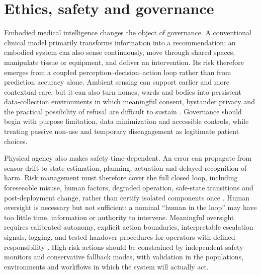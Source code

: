 \section{Ethics, safety and governance}

Embodied medical intelligence changes the object of governance. A conventional clinical model primarily transforms information into a recommendation; an embodied system can also sense continuously, move through shared spaces, manipulate tissue or equipment, and deliver an intervention. Its risk therefore emerges from a coupled perception--decision--action loop rather than from prediction accuracy alone. Ambient sensing can support earlier and more contextual care, but it can also turn homes, wards and bodies into persistent data-collection environments in which meaningful consent, bystander privacy and the practical possibility of refusal are difficult to sustain \cite{MartinezMartin2021AmbientIntelligence,Cohen2020RemoteMonitoringDevices,WHO2021AIEthics}. Governance should begin with purpose limitation, data minimization and accessible controls, while treating passive non-use and temporary disengagement as legitimate patient choices.

Physical agency also makes safety time-dependent. An error can propagate from sensor drift to state estimation, planning, actuation and delayed recognition of harm. Risk management must therefore cover the full closed loop, including foreseeable misuse, human factors, degraded operation, safe-state transitions and post-deployment change, rather than certify isolated components once \cite{ISO14971,Yang2017MedicalRoboticsAutonomy}. Human oversight is necessary but not sufficient: a nominal ``human in the loop'' may have too little time, information or authority to intervene. Meaningful oversight requires calibrated autonomy, explicit action boundaries, interpretable escalation signals, logging, and tested handover procedures for operators with defined responsibility \cite{vanDeSande2026MeaningfulOversight}. High-risk actions should be constrained by independent safety monitors and conservative fallback modes, with validation in the populations, environments and workflows in which the system will actually act.

